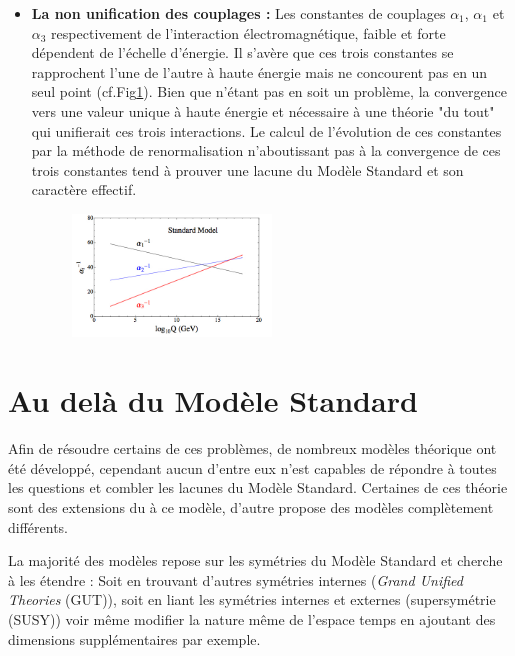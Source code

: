 \begin{itemize}[label=$\bullet$]
\item \textbf{La non unification des couplages : }Les constantes de couplages $\alpha_{1}$, $\alpha_{1}$ et $\alpha_{3}$ respectivement de l'interaction électromagnétique, faible et forte dépendent de l'échelle d'énergie. Il s'avère que ces trois constantes se rapprochent l'une de l'autre à haute énergie mais ne concourent pas en un seul point (cf.Fig\ref{constantes}). Bien que n'étant pas en soit un problème, la convergence vers une valeur unique à haute énergie et nécessaire à une théorie "du tout" qui unifierait ces trois interactions. Le calcul de l'évolution de ces constantes par la méthode de renormalisation n'aboutissant pas à la convergence de ces trois constantes tend à prouver une lacune du Modèle Standard et son caractère effectif.
\begin{figure}[ht!]
\centering
\includegraphics[width=0.50\textwidth]{SM/couplageSM.jpg}
\label{constantes}
\end{figure}
\end{itemize}

\section{Au delà du Modèle Standard}
Afin de résoudre certains de ces problèmes, de nombreux modèles théorique ont été développé, cependant aucun d'entre eux n'est capables de répondre à toutes les questions et combler les lacunes du Modèle Standard. Certaines de ces théorie sont des extensions du à ce modèle, d'autre propose des modèles complètement différents.

La majorité des modèles repose sur les symétries du Modèle Standard et cherche à les étendre : Soit en trouvant d'autres symétries internes (\textit{Grand Unified Theories} (GUT)), soit en liant les symétries internes et externes (supersymétrie (SUSY)) voir même modifier la nature même de l'espace temps en ajoutant des dimensions supplémentaires par exemple.

